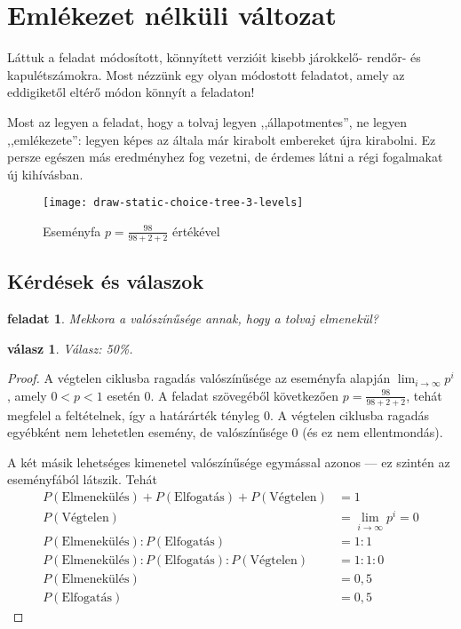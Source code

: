 \documentclass{article}
\newtheorem{task}{feladat}
\newtheorem{answer}{válasz}
\newcommand{\parenthesed}[1]{\left(#1\right)}
\begin{document}
	\section{Emlékezet nélküli változat}

	Láttuk a feladat módosított, könnyített verzióit kisebb járokkelő- rendőr- és kapulétszámokra.
	Most nézzünk egy olyan módostott feladatot, amely az eddigiketől eltérő módon könnyít a feladaton!

	Most az legyen a feladat, hogy a tolvaj legyen ,,állapotmentes'', ne legyen ,,emlékezete'': legyen képes az általa már kirabolt embereket újra kirabolni.
	Ez persze egészen más  eredményhez fog vezetni, de érdemes látni a régi fogalmakat új kihívásban.

	\begin{figure}[H]
		\caption*{Eseményfa $p = \frac{98}{98+2+2}$ értékével}
		\centering
		\texttt{[image: draw-static-choice-tree-3-levels]}
	\end{figure}

	\subsection{Kérdések és válaszok}

	\begin{task}
		Mekkora a valószínűsége annak, hogy a tolvaj elmenekül?
	\end{task}

	\begin{answer}
		Válasz: 50\%.
	\end{answer}

	\begin{proof}
		A végtelen ciklusba ragadás valószínűsége az eseményfa alapján $\lim_{i\to\infty}p^i$, amely $0 < p < 1$ esetén $0$.
		A feladat szövegéből következően $p = \frac{98}{98+2+2}$, tehát megfelel a feltételnek, így a határárték tényleg 0.
		A végtelen ciklusba ragadás egyébként nem lehetetlen esemény, de valószínűsége 0 (és ez nem ellentmondás).

		A két másik lehetséges kimenetel valószínűsége egymással azonos --- ez szintén az eseményfából látszik.
		Tehát
		\begin{align}
			P\parenthesed{\text{Elmenekülés}} + P\parenthesed{\text{Elfogatás}} + P\parenthesed{\text{Végtelen}} &= 1\\
			P\parenthesed{\text{Végtelen}} &= \lim_{i\to\infty}p^i = 0\\
			P\parenthesed{\text{Elmenekülés}} : P\parenthesed{\text{Elfogatás}} &= 1 : 1\\
			P\parenthesed{\text{Elmenekülés}} : P\parenthesed{\text{Elfogatás}} : P\parenthesed{\text{Végtelen}} &= 1 : 1 : 0\\
			P\parenthesed{\text{Elmenekülés}} &= 0,5\\
			P\parenthesed{\text{Elfogatás}} &= 0,5
		\end{align}
	\end{proof}
\end{document}
